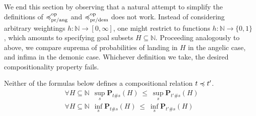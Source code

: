 We end this section by observing that a natural attempt to simplify  the definitions of 
 $\preccurlyeq^{\text{op}}_{\text{pr/ang}}$ and $\preccurlyeq^{\text{op}}_{\text{pr/dem}}$ does not work. Instead of considering arbitrary weightings
 $h \colon \mathbb{N} \to [0,\infty]$, one might restrict to  
 functions $h \colon \mathbb{N} \to \{0,1\}$, which amounts to specifying goal subsets $H \subseteq \mathbb{N}$.
 Proceeding analogously to above, we compare suprema of probabilities of landing in $H$ in the angelic case, and infima in the demonic case. Whichever definition we take, the desired compositionality property fails.
\begin{proposition}
Neither of the formulas below defines a compositional relation $t \preccurlyeq t'$. %
 \begin{align*}
 & \forall H \subseteq \mathbb{N}  ~~ \sup_s  \mathbf{P}_{t\#s} (H)~ \leq~ \sup_s \mathbf{P}_{t'\#s} (H)
\\
 & \forall H \subseteq \mathbb{N}  ~~ \inf_s  \mathbf{P}_{t\#s} (H)~ \leq~ \inf_s \mathbf{P}_{t'\#s} (H)
\end{align*}
\end{proposition}


 
 





